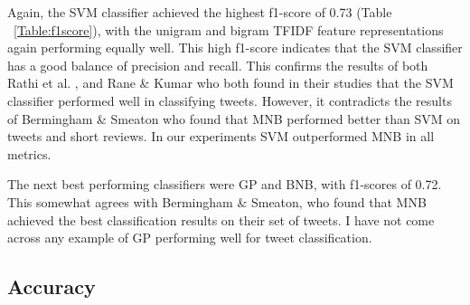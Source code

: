 Again, the SVM classifier achieved the highest f1-score of 0.73 (Table ~\ref{Table:f1score}), with the unigram and bigram TFIDF feature representations again performing equally well. This high f1-score indicates that the SVM classifier has a good balance of precision and recall. This confirms the results of both Rathi et al. \cite{Raithi2018}, and Rane & Kumar \cite{Rane2018} who both found in their studies that the SVM classifier performed well in classifying tweets. However, it contradicts the results of Bermingham & Smeaton who found that MNB performed better than SVM on tweets and short reviews. In our experiments SVM outperformed MNB in all metrics.

The next best performing classifiers were GP and BNB, with f1-scores of 0.72. This somewhat agrees with Bermingham & Smeaton, who found that MNB achieved the best classification results on their set of tweets. I have not come across any example of GP performing well for tweet classification.

\subsection{Accuracy}

